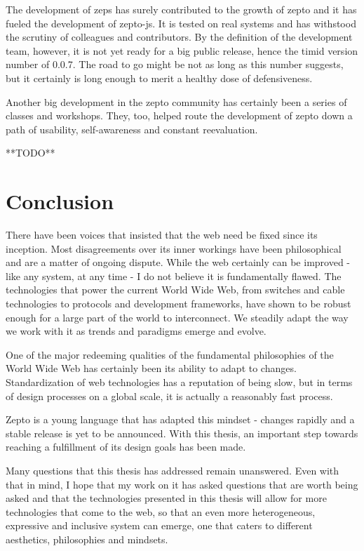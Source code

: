 \documentclass[oneside,11pt,xetex]{scrbook}
\begin{document}
The development of \gls{zeps} has surely contributed to the growth of zepto and
it has fueled the development of zepto-js. It is tested on real systems and has
withstood the scrutiny of colleagues and contributors. By the definition of the
development team, however, it is not yet ready for a big public release, hence
the timid version number of 0.0.7. The road to go might be not as long as this
number suggests, but it certainly is long enough to merit a healthy dose of
defensiveness.

Another big development in the zepto community has certainly been a series of
classes and workshops. They, too, helped route the development of zepto down
a path of usability, self-awareness and constant reevaluation.

**TODO**

\chapter{Conclusion}
\label{chap:conclusion}

There have been voices that insisted that the web need be fixed
since its inception. Most disagreements over its inner workings
have been philosophical and are a matter of ongoing dispute.
While the web certainly can be improved - like any system,
at any time - I do not believe it is fundamentally flawed. The
technologies that power the current World Wide Web, from switches
and cable technologies to protocols and development frameworks,
have shown to be robust enough for a large part of the world
to interconnect. We steadily adapt the way we work with it
as trends and paradigms emerge and evolve.

One of the major redeeming qualities of the fundamental
philosophies of the World Wide Web has certainly been
its ability to adapt to changes. Standardization of web
technologies has a reputation of being slow, but in terms
of design processes on a global scale, it is actually a
reasonably fast process.

Zepto is a young language that has adapted this mindset -
changes rapidly and a stable release is yet to be announced.
With this thesis, an important step towards reaching a fulfillment
of its design goals has been made.

Many questions that this thesis has addressed remain unanswered.
Even with that in mind, I hope that my work on it has asked
questions that are worth being asked and that the technologies
presented in this thesis will allow for more technologies that
come to the web, so that an even more heterogeneous,
expressive and inclusive system can emerge, one that
caters to different aesthetics, philosophies and mindsets.
\end{document}
